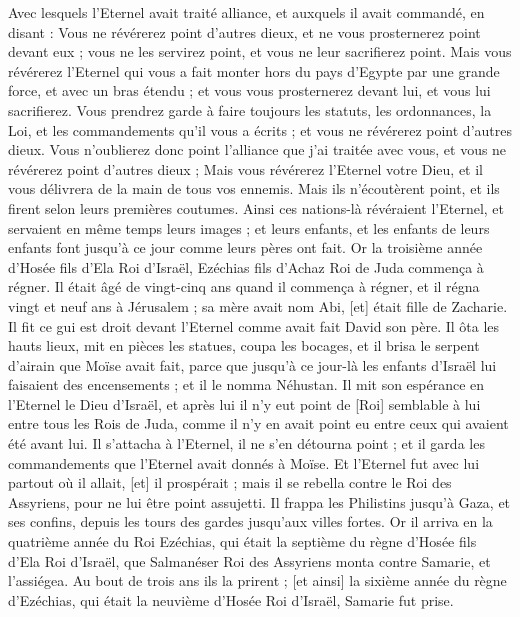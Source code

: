 \begin{multicols}{2}
Avec lesquels l'Eternel avait traité alliance, et auxquels il avait commandé, en disant : Vous ne révérerez point d'autres dieux, et ne vous prosternerez point devant eux ; vous ne les servirez point, et vous ne leur sacrifierez point.
Mais vous révérerez l'Eternel qui vous a fait monter hors du pays d'Egypte par une grande force, et avec un bras étendu ; et vous vous prosternerez devant lui, et vous lui sacrifierez.
Vous prendrez garde à faire toujours les statuts, les ordonnances, la Loi, et les commandements qu'il vous a écrits ; et vous ne révérerez point d'autres dieux.
Vous n'oublierez donc point l'alliance que j'ai traitée avec vous, et vous ne révérerez point d'autres dieux ;
Mais vous révérerez l'Eternel votre Dieu, et il vous délivrera de la main de tous vos ennemis.
Mais ils n'écoutèrent point, et ils firent selon leurs premières coutumes.
Ainsi ces nations-là révéraient l'Eternel, et servaient en même temps leurs images ; et leurs enfants, et les enfants de leurs enfants font jusqu'à ce jour comme leurs pères ont fait.
\VerseOne{}Or la troisième année d'Hosée fils d'Ela Roi d'Israël, Ezéchias fils d'Achaz Roi de Juda commença à régner.
Il était âgé de vingt-cinq ans quand il commença à régner, et il régna vingt et neuf ans à Jérusalem ; sa mère avait nom Abi, [et] était fille de Zacharie.
Il fit ce gui est droit devant l'Eternel comme avait fait David son père.
Il ôta les hauts lieux, mit en pièces les statues, coupa les bocages, et il brisa le serpent d'airain que Moïse avait fait, parce que jusqu'à ce jour-là les enfants d'Israël lui faisaient des encensements ; et il le nomma Néhustan.
Il mit son espérance en l'Eternel le Dieu d'Israël, et après lui il n'y eut point de [Roi] semblable à lui entre tous les Rois de Juda, comme il n'y en avait point eu entre ceux qui avaient été avant lui.
Il s'attacha à l'Eternel, il ne s'en détourna point ; et il garda les commandements que l'Eternel avait donnés à Moïse.
Et l'Eternel fut avec lui partout où il allait, [et] il prospérait ; mais il se rebella contre le Roi des Assyriens, pour ne lui être point assujetti.
Il frappa les Philistins jusqu'à Gaza, et ses confins, depuis les tours des gardes jusqu'aux villes fortes.
Or il arriva en la quatrième année du Roi Ezéchias, qui était la septième du règne d'Hosée fils d'Ela Roi d'Israël, que Salmanéser Roi des Assyriens monta contre Samarie, et l'assiégea.
Au bout de trois ans ils la prirent ; [et ainsi] la sixième année du règne d'Ezéchias, qui était la neuvième d'Hosée Roi d'Israël, Samarie fut prise.

\end{multicols}
